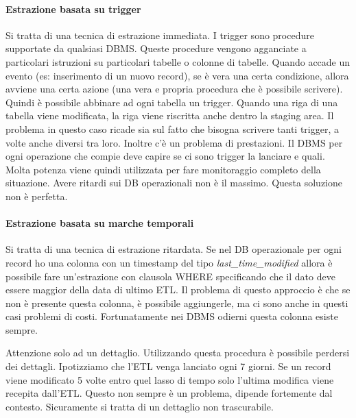 \paragraph{Estrazione basata su trigger}
Si tratta di una tecnica di estrazione immediata. I trigger sono procedure supportate da qualsiasi DBMS. Queste procedure vengono agganciate a particolari istruzioni su particolari tabelle o colonne di tabelle. Quando accade un evento (es: inserimento di un nuovo record), se è vera una certa condizione, allora avviene una certa azione (una vera e propria procedura che è possibile scrivere).
\noindent Quindi è possibile abbinare ad ogni tabella un trigger. Quando una riga di una tabella viene modificata, la riga viene riscritta anche dentro la staging area. Il problema in questo caso ricade sia sul fatto che bisogna scrivere tanti trigger, a volte anche diversi tra loro. Inoltre c'è un problema di prestazioni. Il DBMS per ogni operazione che compie deve capire se ci sono trigger la lanciare e quali. Molta potenza viene quindi utilizzata per fare monitoraggio completo della situazione. Avere ritardi sui DB operazionali non è il massimo. Questa soluzione non è perfetta.

\paragraph{Estrazione basata su marche temporali}
Si tratta di una tecnica di estrazione ritardata. Se nel DB operazionale per ogni record ho una colonna con un timestamp del tipo \textit{last\_time\_modified} allora è possibile fare un'estrazione con clausola WHERE specificando che il dato deve essere maggior della data di ultimo ETL. Il problema di questo approccio è che se non è presente questa colonna, è possibile aggiungerle, ma ci sono anche in questi casi problemi di costi. Fortunatamente nei DBMS odierni questa colonna esiste sempre.
\begin{warn}
	Attenzione solo ad un dettaglio. Utilizzando questa procedura è possibile perdersi dei dettagli. Ipotizziamo che l'ETL venga lanciato ogni 7 giorni. Se un record viene modificato 5 volte entro quel lasso di tempo solo l'ultima modifica viene recepita dall'ETL. Questo non sempre è un problema, dipende fortemente dal contesto. Sicuramente si tratta di un dettaglio non trascurabile.
\end{warn}

